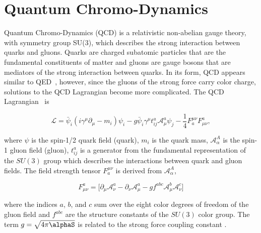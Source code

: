 
\section{Quantum Chromo-Dynamics}

Quantum Chromo-Dynamics (QCD) is a relativistic non-abelian gauge theory, with symmetry group SU(3), which describes the strong interaction between quarks and gluons. Quarks are charged subatomic particles that are the fundamental constituents of matter and gluons are gauge bosons that are mediators of the strong interaction between quarks. In its form, QCD appears similar to QED~\cite{Seymour:2005hs}, however, since the gluons of the strong force carry color charge, solutions to the QCD Lagrangian become more complicated. The QCD Lagrangian~\cite{qcdbook} is 

\begin{equation}
\mathcal{L}=\bar{\psi}_{i}(i\gamma^{\mu}\partial_{\mu}-m_{i})\psi_{i}-g\bar{\psi}_{i}\gamma^{\mu}t_{ij}^{a}\mathcal{A}_{\mu}^{a}\psi_{j}-\frac{1}{4}F^{\mu\nu}_{a}F_{\mu\nu}^{a},
\label{eq:lagrangian}
\end{equation}

where $\psi$ is the spin-1/2 quark field (quark), $m_{i}$ is the quark mass,  $\mathcal{A}_{\alpha}^{A}$ is the spin-1 gluon field (gluon), $t_{ij}^{a}$ is a generator from the fundamental representation of the $SU(3)$ group which describes the interactions between quark and gluon fields. The field strength tensor $F^{\mu\nu}_{a}$ is derived from $\mathcal{A}_{\alpha}^{A}$,

\begin{equation}
F_{\mu\nu}^{a}=\Big[ \partial_{\mu}\mathcal{A}_{\nu}^{a} - \partial_{\nu}\mathcal{A}_{\mu}^{a} - g f^{abc}\mathcal{A}_{\mu}^{b}\mathcal{A}_{\nu}^{c}\Big]
\label{eq:fieldtensor}
\end{equation}

where the indices $a$, $b$, and $c$ sum over the eight color degrees of freedom of the gluon field and $f^{abc}$ are the structure constants of the $SU(3)$ color group. The term $g=\sqrt{4 \pi \alphaS }$ is related to the strong force coupling constant \alphaS.

